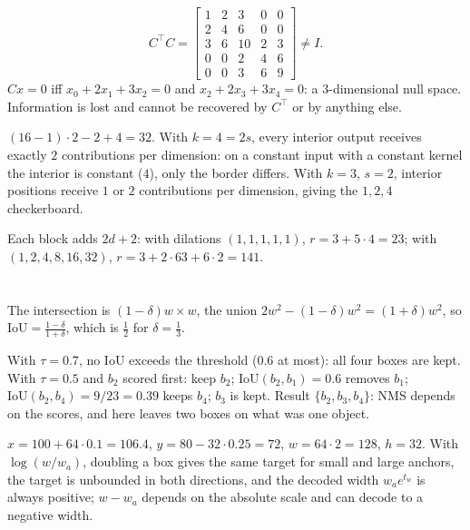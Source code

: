 \[
  C^\top C = \begin{bmatrix}1&2&3&0&0\\2&4&6&0&0\\3&6&10&2&3\\0&0&2&4&6\\0&0&3&6&9\end{bmatrix}\neq I .
\]
$Cx = 0$ iff $x_0 + 2x_1 + 3x_2 = 0$ and $x_2 + 2x_3 + 3x_4 = 0$: a $3$-dimensional null space. Information is lost and cannot be
recovered by $C^\top$ or by anything else.

$(16 - 1)\cdot2 - 2 + 4 = 32$. With $k = 4 = 2s$, every interior output receives exactly $2$ contributions per
dimension: on a constant input with a constant kernel the interior is constant ($4$), only the
border differs. With $k = 3$, $s = 2$, interior positions receive $1$ or $2$ contributions per dimension,
giving the $1,2,4$ checkerboard.

Each block adds $2d + 2$: with dilations $(1,1,1,1,1)$, $r = 3 + 5\cdot4 = 23$; with $(1,2,4,8,16,32)$,
$r = 3 + 2\cdot63 + 6\cdot2 = 141$.

\section{}

The intersection is $(1 - \delta)w\times w$, the union $2w^2 - (1 - \delta)w^2 = (1 + \delta)w^2$, so $\mathrm{IoU} = \frac{1 - \delta}{1 + \delta}$, which is $\frac12$ for $\delta = \frac13$.

With $\tau = 0.7$, no IoU exceeds the threshold ($0.6$ at most): all four boxes are kept. With $\tau = 0.5$ and $b_2$
scored first: keep $b_2$; $\mathrm{IoU}(b_2, b_1) = 0.6$ removes $b_1$; $\mathrm{IoU}(b_2, b_4) = 9/23 = 0.39$ keeps $b_4$; $b_3$ is kept. Result
$\{b_2, b_3, b_4\}$: NMS depends on the scores, and here leaves two boxes on what was one object.

$x = 100 + 64\cdot0.1 = 106.4$, $y = 80 - 32\cdot0.25 = 72$, $w = 64\cdot2 = 128$, $h = 32$. With $\log(w/w_a)$, doubling a box gives the same
target for small and large anchors, the target is unbounded in both directions, and the
decoded width $w_ae^{t_w}$ is always positive; $w - w_a$ depends on the absolute scale and can decode to a
negative width.


